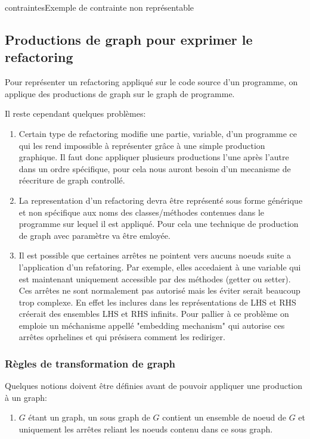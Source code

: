 \documentclass[a4paper, 12pt]{article}
\begin{document}
\begin{figu}{contraintes}{Exemple de contrainte non représentable}
\subsection{Productions de graph pour exprimer le refactoring}

Pour représenter un refactoring appliqué sur le code source d'un programme, on applique des productions de graph sur le graph de programme.

Il reste cependant quelques problèmes:

\begin{enumerate}
\item Certain type de refactoring modifie une partie, variable, d'un programme ce qui les rend impossible à représenter grâce à une simple production graphique. Il faut donc appliquer plusieurs productions l'une après l'autre dans un ordre spécifique, pour cela nous auront besoin d'un mecanisme de réecriture de graph controllé.

\item La representation d'un refactoring devra être représenté sous forme générique et non spécifique aux noms des classes/méthodes contenues dans le programme sur lequel il est appliqué. Pour cela une technique de production de graph avec paramètre va être emloyée.

\item Il est possible que certaines arrêtes ne pointent vers aucuns noeuds suite a l'application d'un refatoring. Par exemple, elles accedaient à une variable qui est maintenant uniquement accessible par des méthodes (getter ou setter). Ces arrêtes ne sont normalement pas autorisé mais les éviter serait beaucoup trop complexe. En effet les inclures dans les représentations de LHS et RHS créerait des ensembles LHS et RHS infinits. Pour pallier à ce problème on emploie un méchanisme appellé "embedding mechanism" qui autorise ces arrêtes oprhelines et qui présisera comment les rediriger.
\end{enumerate}

\subsubsection{Règles de transformation de graph}

Quelques notions doivent être définies avant de pouvoir appliquer une production à un graph:

\begin{enumerate}
\item \(G\) étant un graph, un sous graph de \(G\) contient un ensemble de noeud de \(G\) et uniquement les arrêtes reliant les noeuds contenu dans ce sous graph.


\end{enumerate}
\end{figu}
\end{document}
